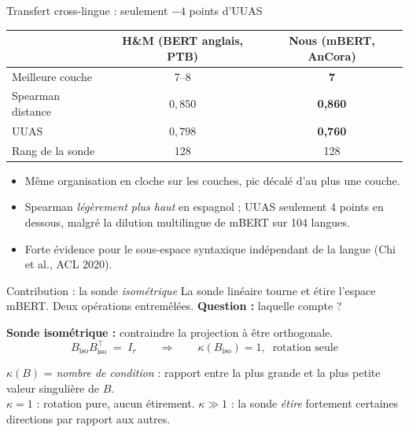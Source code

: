 \documentclass[aspectratio=169,11pt]{beamer}
\begin{document}
\begin{frame}{Transfert cross-lingue : seulement $-4$ points d'UUAS}
  \centering
  \vspace{0.3cm}
  \begin{tabular}{lcc}
    \toprule
                         & \textbf{H\&M (BERT anglais, PTB)} & \textbf{Nous (mBERT, AnCora)} \\
    \midrule
    Meilleure couche     & 7--8              & \textbf{7} \\
    Spearman distance    & $0{,}850$         & \textbf{0{,}860} \\
    UUAS                 & $0{,}798$         & \textbf{0{,}760} \\
    Rang de la sonde     & 128               & 128 \\
    \bottomrule
  \end{tabular}

  \vspace{0.5cm}
  \begin{itemize}\setlength\itemsep{4pt}
    \item Même organisation en cloche sur les couches, pic décalé d'au
          plus une couche.
    \item Spearman \emph{légèrement plus haut} en espagnol ; UUAS
          seulement $4$ points en dessous, malgré la dilution
          multilingue de mBERT sur 104 langues.
    \item Forte évidence pour le \alert{sous-espace syntaxique
          indépendant de la langue} (Chi et al., ACL 2020).
  \end{itemize}
\end{frame}



\begin{frame}{Contribution : la sonde \emph{isométrique}}
  La sonde linéaire \alert{tourne et étire} l'espace mBERT.
  Deux opérations entremêlées. \quad \textbf{Question :} laquelle compte ?

  \vspace{0.5cm}
  \textbf{Sonde isométrique :} contraindre la projection à être orthogonale.
  \[
    B_\mathrm{iso} B_\mathrm{iso}^\top \;=\; I_r
    \qquad \Longrightarrow \qquad
    \kappa(B_\mathrm{iso}) = 1, \;\; \text{rotation seule}
  \]

  \vspace{0.4cm}
  \footnotesize
  \alert{$\kappa(B)$} = \emph{nombre de condition} : rapport entre la plus
  grande et la plus petite valeur singulière de $B$. \\[2pt]
  $\kappa = 1$ : rotation pure, aucun étirement. \quad
  $\kappa \gg 1$ : la sonde \emph{étire} fortement certaines directions
  par rapport aux autres.
\end{frame}
\end{document}
